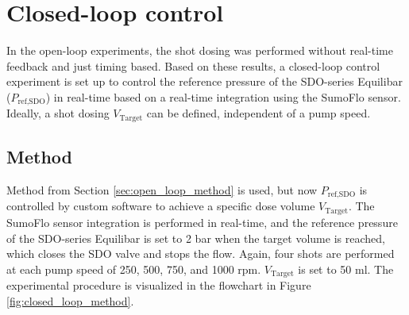 \documentclass[12pt,a4paper]{article}
\begin{document}
\clearpage
\section{Closed-loop control}
\label{sec:closed_loop}
In the open-loop experiments, the shot dosing was performed without real-time feedback and just timing based. Based on these results, a closed-loop control experiment is set up to control the reference pressure of the SDO-series Equilibar ($P_{\text{ref,SDO}}$) in real-time based on a real-time integration using the SumoFlo sensor. Ideally, a shot dosing $V_{\text{Target}}$ can be defined, independent of a pump speed.

\subsection{Method}
\label{sec:closed_loop_method}
Method from Section \ref{sec:open_loop_method} is used, but now $P_{\text{ref,SDO}}$ is controlled by custom software to achieve a specific dose volume $V_{\text{Target}}$. The SumoFlo sensor integration is performed in real-time, and the reference pressure of the SDO-series Equilibar is set to 2 bar when the target volume is reached, which closes the SDO valve and stops the flow. Again, four shots are performed at each pump speed of 250, 500, 750, and 1000 rpm. $V_{\text{Target}}$ is set to 50 ml. The experimental procedure is visualized in the flowchart in Figure \ref{fig:closed_loop_method}.
\end{document}
